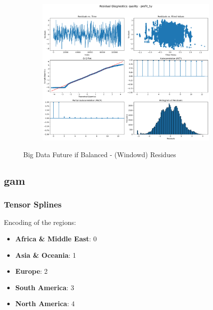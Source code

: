 \documentclass[11pt,english,a4paper,hidelinks]{book}
\begin{document}
\begin{figure}[H]
\begin{subfigure}[b]{0.32\textwidth}
    \end{subfigure}
    \hfill
    \begin{subfigure}[b]{0.32\textwidth}
        \centering
        \includegraphics[width=\textwidth]{images/code/models/linear_regression/first_model/IF HARD Balanced/quality_profit_5y_residuals - Gaussian.png}
    \end{subfigure}
    \caption{Big Data Future \acrshort{if} Balanced - (Windowd) Residues}
    \label{fig:linear_regression_if_hard_balanced_residues}
\end{figure}

\subsection{\acrshort{gam}}

\subsubsection{Tensor Splines}

Encoding of the regions:
\begin{itemize}
    \item \textbf{Africa \& Middle East}: 0
    \item \textbf{Asia \& Oceania}: 1
    \item \textbf{Europe}: 2
    \item \textbf{South America}: 3
    \item \textbf{North America}: 4
\end{itemize}
\end{document}
